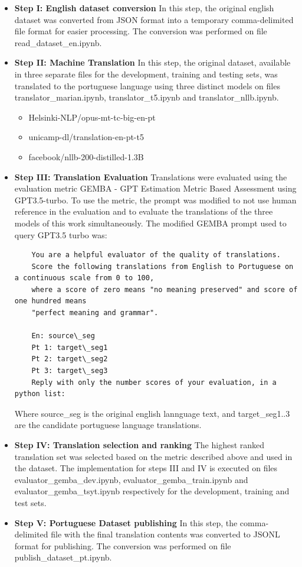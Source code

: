 \documentclass{article}
\begin{document}
\begin{itemize}
    \item \textbf{Step I: English dataset conversion} In this step, the original
    english dataset was converted from JSON format into a temporary 
    comma-delimited file format for easier processing. The conversion was
    performed on file read\_dataset\_en.ipynb.
    \item \textbf{Step II: Machine Translation} In this step, the original
    dataset, available in three separate files for the development, training and
    testing sets, was translated to the portuguese language using three distinct
    models on files translator\_marian.ipynb, translator\_t5.ipynb and translator\_nllb.ipynb.
        \begin{itemize}
            \item Helsinki-NLP/opus-mt-tc-big-en-pt
            \item unicamp-dl/translation-en-pt-t5
            \item facebook/nllb-200-distilled-1.3B
        \end{itemize}
    \item \textbf{Step III: Translation Evaluation} Translations were evaluated
    using the evaluation metric GEMBA - GPT Estimation Metric Based Assessment
    \cite{kocmi2023large} using GPT3.5-turbo. To use the metric, the prompt was
    modified to not use human reference in the evaluation and to evaluate the
    translations of the three models of this work simultaneously.
    The modified GEMBA prompt used to query GPT3.5 turbo was:
    \begin{verbatim}
    You are a helpful evaluator of the quality of translations.
    Score the following translations from English to Portuguese on a continuous scale from 0 to 100, 
    where a score of zero means "no meaning preserved" and score of one hundred means
    "perfect meaning and grammar".

    En: source\_seg
    Pt 1: target\_seg1
    Pt 2: target\_seg2
    Pt 3: target\_seg3
    Reply with only the number scores of your evaluation, in a python list:
    \end{verbatim}
    Where source\_seg is the original english lannguage text, and
    target\_seg1..3 are the candidate portuguese language translations.
    \item \textbf{Step IV: Translation selection and ranking} The highest ranked translation set
    was selected based on the metric described above and used in the dataset.
    The implementation for steps III and IV is executed on files
    evaluator\_gemba\_dev.ipynb, evaluator\_gemba\_train.ipynb and
    evaluator\_gemba\_tsyt.ipynb respectively for the development, training and
    test sets.
    \item \textbf{Step V: Portuguese Dataset publishing}  In this step, the
    comma-delimited file with the final translation contents was converted to
    JSONL format for publishing. The conversion was performed on file 
    publish\_dataset\_pt.ipynb.
\end{itemize}
 
\end{document}
